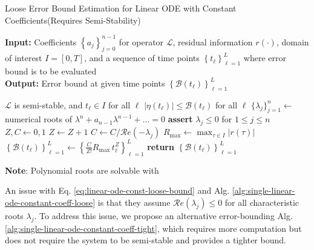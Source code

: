 \documentclass[accepted]{uai2023}
\newcommand{\Err}{\eta}
\newcommand{\Bound}{\mathcal{B}}
\renewcommand{\L}{\mathcal{L}}
\renewcommand{\Re}[1]{\mathcal{R}e\left(#1\right)}
\begin{document}
    \begin{algorithm}
        \small
        \caption{Loose Error Bound Estimation for Linear ODE with Constant Coefficients\quad (Requires Semi-Stability)}\label{alg:single-linear-ode-constant-coeff-loose}
        \textbf{Input:} Coefficients $\left\{a_j\right\}_{j=0}^{n-1}$ for operator $\L$, residual information $r(\cdot)$, domain of interest $I = [0, T]$, and a sequence of time points $\left\{t_\ell\right\}_{\ell=1}^{L}$ where error bound is to be evaluated\\
        \textbf{Output:} Error bound at given time points $\left\{\Bound(t_\ell)\right\}_{\ell=1}^{L}$
        \begin{algorithmic}
            \Require $\L$ is semi-stable, and $t_\ell \in I$ for all $\ell$
            \Ensure $\left|\Err(t_\ell)\right| \leq \Bound(t_\ell)$ for all $\ell$
            \State $\{\lambda_j\}_{j=1}^{n} \gets$ numerical roots of $\lambda^n+a_{n-1}\lambda^{n-1}+\dots=0$ 
            \State \textbf{assert} $\lambda_j \leq 0$ for $1 \leq j \leq n$ 
            \State $Z, C \gets 0, 1$
                \If{$\Re{\lambda_j} = 0$}
                    \State $Z \gets Z + 1$
                \Else
                    \State $C \gets C / \Re{-\lambda_j}$
                \EndIf
            \EndFor
            \State $R_{\max} \gets \max_{\tau \in I} |r(\tau)|$ 
            \State $\left\{\Bound(t_\ell)\right\}_{\ell=1}^{L} \gets \left\{\frac{C}{Z!}R_{\max}\, t_\ell^{Z}\right\}_{\ell=1}^{L}$
            \State \textbf{return} $\left\{\Bound(t_\ell)\right\}_{\ell=1}^{L}$
        \end{algorithmic}
        \vspace{0.5em} 
        \textbf{Note}: Polynomial roots are solvable with \cite{jenkins1970three}
    \end{algorithm}

    An issue with Eq. \ref{eq:linear-ode-const-loose-bound} and Alg. \ref{alg:single-linear-ode-constant-coeff-loose} is that they assume $\Re{\lambda_j} \leq 0$ for all characteristic roots $\lambda_j$. 
    To address this issue, we propose an alternative error-bounding Alg. \ref{alg:single-linear-ode-constant-coeff-tight}, which requires more computation but does not require the system to be semi-stable and provides a tighter bound.
\end{document}
